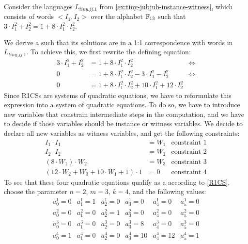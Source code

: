 \begin{example}
\label{ex:TJJ-r1cs}
 Consider the languages $L_{tiny.jj.1}$ from \examplename{} \ref{ex:tiny-jubjub-instance-witness}, which consists of words $<I_1,I_2>$ over the alphabet $\mathbb{F}_{13}$ such that $3\cdot I_1^2 + I_2^2 = 1 + 8\cdot I_1^2\cdot I_2^2$. 

We derive a  such that its solutions are in a 1:1 correspondence with words in $L_{tiny.jj.1}$.  To achieve this, we first rewrite the defining equation:
\begin{align*}
3\cdot I_1^2 + I_2^2  & = 1 + 8\cdot I_1^2\cdot I_2^2 & \Leftrightarrow \\
 0 & = 1 + 8\cdot I_1^2\cdot I_2^2 - 3\cdot I_1^2 - I_2^2  & \Leftrightarrow \\
 0 & = 1 + 8\cdot I_1^2\cdot I_2^2 + 10\cdot I_1^2 +12\cdot I_2^2
\end{align*}
Since R1CSs are systems of quadratic equations, we have to reformulate this expression into a system of quadratic equations. To do so, we have to introduce new variables that constrain intermediate steps in the computation, and we have to decide if those variables should be instance or witness variables. We decide to declare all new variables as witness variables, and get the following constraints:
\begin{align*}
I_1 \cdot I_1 & = W_1 & \text{constraint } 1\\
I_2 \cdot I_2 & = W_2 & \text{constraint } 2\\
(8 \cdot W_1) \cdot W_2 & = W_3 & \text{constraint } 3\\
(12\cdot W_2 + W_3 + 10\cdot W_1 + 1)\cdot 1 & = 0 & \text{constraint } 4
\end{align*}
To see that these four quadratic equations qualify as a  according to  \ref{R1CS}, choose the parameter $n=2$, $m=3$,  $k=4$, and the following values:
$$
\begin{array}{llllll}
a_0^1 = 0 & a_1^1= 1 & a_2^1= 0 & a_3^1 = 0 & a_4^1= 0  & a_5^1= 0 \\ 
a_0^2 = 0 & a_1^2= 0 & a_2^2= 1 & a_3^2 = 0 & a_4^2= 0  & a_5^2= 0 \\ 
a_0^3 = 0 & a_1^3= 0 & a_2^3= 0 & a_3^3 = 8 & a_4^3= 0  & a_5^3= 0 \\ 
a_0^4 = 1 & a_1^4= 0 & a_2^4= 0 & a_3^4 = 10 & a_4^4= 12  & a_5^4= 1 \\ 
\\

\end{array}$$
\end{example}
